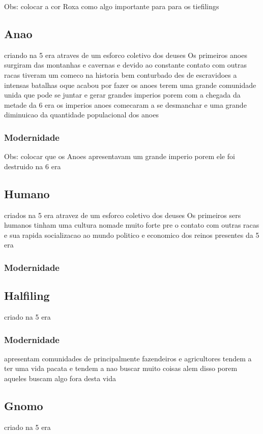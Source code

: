 \documentclass{book}
\begin{document}
Obs: colocar a cor Roxa como algo importante para para os tiefilings 

\subsection{Anao}
criando na 5 era atraves de um esforco coletivo dos deuses 
Os primeiros anoes surgiram das montanhas e cavernas e devido ao constante contato com outras 
racas tiveram um comeco na historia bem conturbado des de escravidoes a intensas batalhas 
oque acabou por fazer os anoes terem uma grande comunidade unida que pode se juntar e gerar 
grandes imperios porem com a chegada da metade da 6 era os imperios anoes comecaram a se 
desmanchar e uma grande diminuicao da quantidade populacional dos anoes 

\subsubsection*{Modernidade}

Obs: colocar que os Anoes apresentavam um grande imperio porem ele foi destruido na 6 era 

\subsection{Humano}
criados na 5 era atravez de um esforco coletivo dos deuses 
Os primeiros sers humanos tinham uma cultura nomade muito forte pre o contato com outras racas 
e sua rapida socializacao ao mundo politico e economico dos reinos presentes da 5 era

\subsubsection{Modernidade}

\subsection{Halfiling}
criado na 5 era 

\subsubsection{Modernidade}
apresentam comunidades de principalmente fazendeiros e agricultores tendem a ter uma vida pacata
e tendem a nao buscar muito coisas alem disso porem aqueles buscam algo fora desta vida 

\subsection{Gnomo}
criado na 5 era
\end{document}
